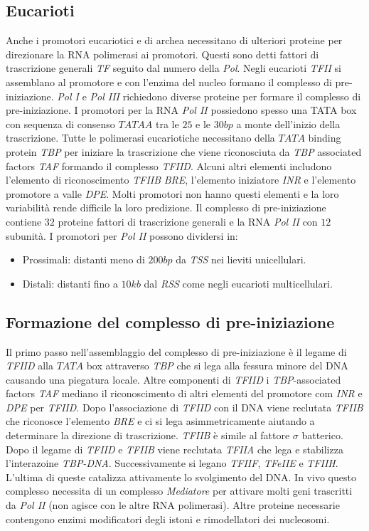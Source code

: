 \subsection{Eucarioti}
Anche i promotori eucariotici e di archea necessitano di ulteriori proteine per direzionare la RNA polimerasi ai promotori. Questi sono detti fattori di trascrizione generali
\emph{TF} seguito dal numero della \emph{Pol}. Negli eucarioti \emph{TFII} si assemblano al promotore e con l'enzima del nucleo formano il complesso di pre-iniziazione. \emph{Pol I} e 
\emph{Pol III} richiedono diverse proteine per formare il complesso di pre-iniziazione. I promotori per la RNA \emph{Pol II} possiedono spesso una TATA box con sequenza di consenso
$TATAA$ tra le $25$ e le $30bp$ a monte dell'inizio della trascrizione. Tutte le polimerasi eucariotiche necessitano della $TATA$ binding protein \emph{TBP} per iniziare la trascrizione
che viene riconosciuta da \emph{TBP} associated factors \emph{TAF} formando il complesso \emph{TFIID}. Alcuni altri elementi includono l'elemento di riconoscimento \emph{TFIIB} 
\emph{BRE}, l'elemento iniziatore \emph{INR} e l'elemento promotore a valle \emph{DPE}. Molti promotori non hanno questi elementi e la loro variabilit\`a rende difficile la loro 
predizione. Il complesso di pre-iniziazione contiene $32$ proteine fattori di trascrizione generali e la RNA \emph{Pol II} con $12$ subunit\`a. I promotori per \emph{Pol II} possono
dividersi in:
\begin{itemize}
	\item Prossimali: distanti meno di $200bp$ da \emph{TSS} nei lieviti unicellulari.
	\item Distali: distanti fino a $10kb$ dal \emph{RSS} come negli eucarioti multicellulari. 
\end{itemize}
\subsection{Formazione del complesso di pre-iniziazione}
Il primo passo nell'assemblaggio del complesso di pre-iniziazione \`e il legame di \emph{TFIID} alla $TATA$ box attraverso \emph{TBP} che si lega alla fessura minore del DNA causando
una piegatura locale. Altre componenti di \emph{TFIID} i \emph{TBP}-associated factors \emph{TAF} mediano il riconoscimento di altri elementi del promotore com \emph{INR} e \emph{DPE} per
\emph{TFIID}. Dopo l'associazione di \emph{TFIID} con il DNA viene reclutata \emph{TFIIB} che riconosce l'elemento \emph{BRE} e ci si lega asimmetricamente aiutando a determinare la
direzione di trascrizione. \emph{TFIIB} \`e simile al fattore $\sigma$ batterico. Dopo il legame di \emph{TFIID} e \emph{TFIIB} viene reclutata \emph{TFIIA} che lega e stabilizza 
l'interazoine \emph{TBP-DNA}. Successivamente si legano \emph{TFIIF}, \emph{TFeIIE} e \emph{TFIIH}. L'ultima di queste catalizza attivamente lo svolgimento del DNA. In vivo questo 
complesso necessita di un complesso \emph{Mediatore} per attivare molti geni trascritti da  \emph{Pol II} (non agisce con le altre RNA polimerasi). Altre proteine necessarie contengono
enzimi modificatori degli istoni e rimodellatori dei nucleosomi. 
